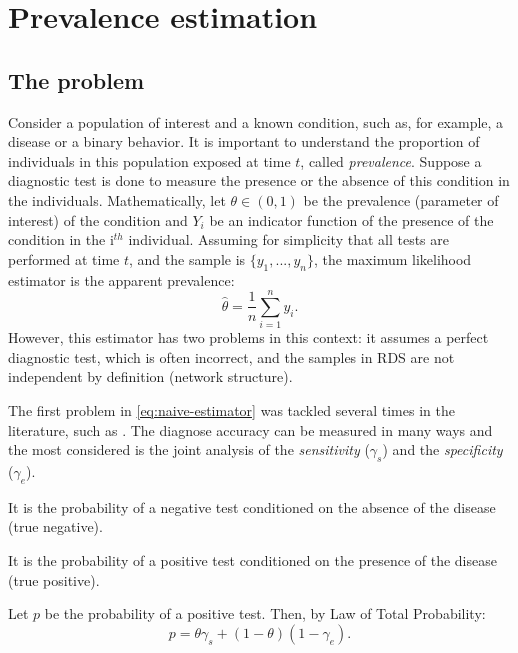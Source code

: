 

\chapter{Prevalence estimation}

\section{The problem}

Consider a population of interest and a known condition, such as, for example,
a disease or a binary behavior. It is important to understand the proportion
of individuals in this population exposed at time $t$, called {\em
prevalence}. Suppose a diagnostic test is done to measure the presence or the
absence of this condition in the individuals. Mathematically, let $\theta \in
(0,1)$ be the prevalence (parameter of interest) of the condition and $Y_i$ be an indicator function of the presence of the condition in the i$^{th}$ individual.
Assuming for simplicity that all tests are performed at time $t$, and the
sample is $\{y_1, ..., y_n\}$, the maximum likelihood estimator is the
apparent prevalence: 
\begin{equation}
    \label{eq:naive-estimator}
    \hat{\theta} = \frac{1}{n}\sum_{i=1}^n y_i.
\end{equation}
However, this estimator has two problems in this context: it assumes a perfect
diagnostic test, which is often incorrect, and the samples in RDS are not
independent by definition (network structure). 

The first problem in \eqref{eq:naive-estimator} was tackled several times in
the literature, such as \cite{mcinturff2004modelling}. The diagnose accuracy
can be measured in many ways and the most considered is the joint analysis of
the {\em sensitivity} ($\gamma_s$) and the {\em specificity}
($\gamma_e$). 

\begin{definition}[Specificity]
    It is the probability of a negative test conditioned on the absence of the
    disease (true negative).
\end{definition}

\begin{definition}[Sensitivity]
    It is the probability of a positive test conditioned on the presence of
    the disease (true positive). 
\end{definition}

Let $p$ be the probability of a positive test. Then, by Law of Total
Probability: 
\begin{equation}
    p = \theta\gamma_s + (1-\theta)(1-\gamma_e).    
\end{equation}

